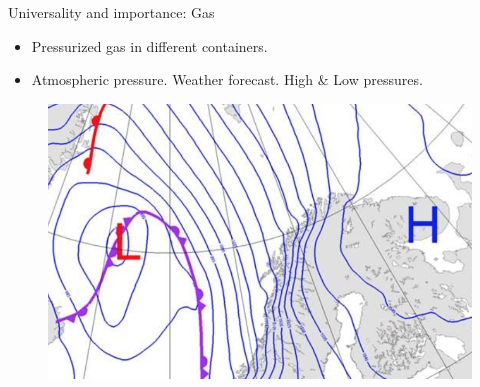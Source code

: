 \documentclass[usenames,dvipsnames]{beamer}
\begin{document}
\begin{frame}{\huge{Universality and importance: Gas}}%
   \begin{itemize}
       \item Pressurized gas in different containers.
       \item Atmospheric pressure. Weather forecast. High \& Low pressures.
   \end{itemize}
      \begin{figure}
          \centering
         
         \includegraphics[scale=0.35]{Images/isobaric_map.png}

\end{figure}
\end{frame}
\end{document}
